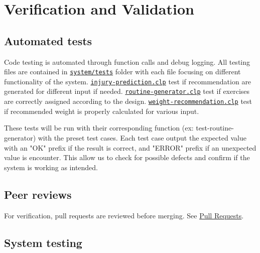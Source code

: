 \documentclass{article}
\begin{document}
\section{Verification and Validation}

\subsection{Automated tests}

Code testing is automated through function calls and debug logging. All testing files are contained in \texttt{\href{https://github.com/joshpham97/COMP474Project_OptionB_PhamTran_ExerciseRecommender/tree/main/system/tests}{system/tests}} folder with each file focusing on different functionality of the system. \href{https://github.com/joshpham97/COMP474Project_OptionB_PhamTran_ExerciseRecommender/blob/main/system/tests/injury-prediction.clp}{\texttt{injury-prediction.clp}} test if recommendation are generated for different input if needed. \href{https://github.com/joshpham97/COMP474Project_OptionB_PhamTran_ExerciseRecommender/blob/main/system/tests/routine-generator.clp}{\texttt{routine-generator.clp}} test if exercises are correctly assigned according to the design. \href{https://github.com/joshpham97/COMP474Project_OptionB_PhamTran_ExerciseRecommender/blob/main/system/tests/weight-recommendation.clp}{\texttt{weight-recommendation.clp}} test if recommended weight is properly calculated for various input. 

These tests will be run with their corresponding function (ex: test-routine-generator) with the preset test cases. Each test case output the expected value with an "OK" prefix if the result is correct, and "ERROR" prefix if an unexpected value is encounter. This allow us to check for possible defects and confirm if the system is working as intended.

\subsection{Peer reviews}

For verification, pull requests are reviewed before merging. See \href{https://github.com/joshpham97/COMP474Project_OptionB_PhamTran_ExerciseRecommender/pulls?q=is%3Apr+is%3Aclosed}{Pull Requests}.

\subsection{System testing}
\end{document}
